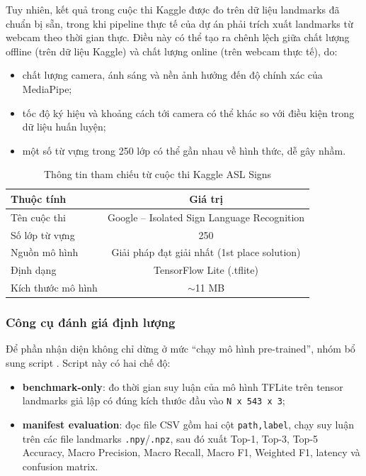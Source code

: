 Tuy nhiên, kết quả trong cuộc thi Kaggle được đo trên dữ liệu landmarks đã chuẩn bị sẵn, trong khi
pipeline thực tế của dự án phải trích xuất landmarks từ webcam theo thời gian thực. Điều này có thể
tạo ra chênh lệch giữa chất lượng offline (trên dữ liệu Kaggle) và chất lượng online (trên webcam
thực tế), do:
\begin{itemize}
    \item chất lượng camera, ánh sáng và nền ảnh hưởng đến độ chính xác của MediaPipe;
    \item tốc độ ký hiệu và khoảng cách tới camera có thể khác so với điều kiện trong dữ liệu
    huấn luyện;
    \item một số từ vựng trong 250 lớp có thể gần nhau về hình thức, dễ gây nhầm.
\end{itemize}

\begin{table}[H]
\centering
\caption{Thông tin tham chiếu từ cuộc thi Kaggle ASL Signs}
\label{tab:kaggle-asl-reference}
\begin{tabularx}{\textwidth}{|X|c|}
\hline
\textbf{Thuộc tính} & \textbf{Giá trị} \\
\hline
Tên cuộc thi & Google -- Isolated Sign Language Recognition \\
\hline
Số lớp từ vựng & 250 \\
\hline
Nguồn mô hình & Giải pháp đạt giải nhất (1st place solution) \\
\hline
Định dạng & TensorFlow Lite (.tflite) \\
\hline
Kích thước mô hình & $\sim$11 MB \\
\hline
\end{tabularx}
\end{table}

\subsubsection{Công cụ đánh giá định lượng}

Để phần nhận diện không chỉ dừng ở mức ``chạy mô hình pre-trained'', nhóm bổ sung script
. Script này có hai chế độ:
\begin{itemize}
    \item \textbf{benchmark-only}: đo thời gian suy luận của mô hình TFLite trên tensor landmarks giả lập
    có đúng kích thước đầu vào \texttt{N x 543 x 3};
    \item \textbf{manifest evaluation}: đọc file CSV gồm hai cột \texttt{path,label}, chạy suy luận trên
    các file landmarks \texttt{.npy}/\texttt{.npz}, sau đó xuất Top-1, Top-3, Top-5 Accuracy, Macro
    Precision, Macro Recall, Macro F1, Weighted F1, latency và confusion matrix.
\end{itemize}

